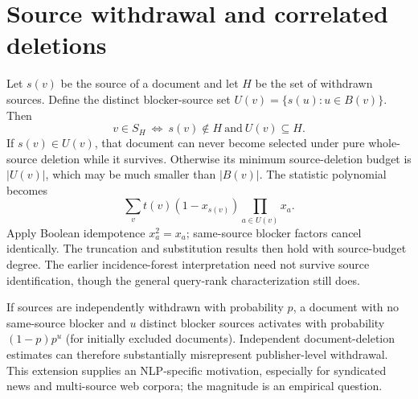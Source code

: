 \documentclass[11pt,a4paper]{article}
\theoremstyle{definition}\newtheorem{definition}[theorem]{Definition}
\begin{document}
\section{Source withdrawal and correlated deletions}\label{sec:sources}
Let $s(v)$ be the source of a document and let $H$ be the set of withdrawn sources. Define the distinct blocker-source set $U(v)=\{s(u):u\in B(v)\}$. Then
\begin{equation}
 v\in S_H\ \Longleftrightarrow\ s(v)\notin H\ \text{and}\ U(v)\subseteq H.
\end{equation}
If $s(v)\in U(v)$, that document can never become selected under pure whole-source deletion while it survives. Otherwise its minimum source-deletion budget is $|U(v)|$, which may be much smaller than $|B(v)|$. The statistic polynomial becomes
\[
 \sum_v t(v)(1-x_{s(v)})\prod_{a\in U(v)}x_a.
\]
Apply Boolean idempotence $x_a^2=x_a$; same-source blocker factors cancel identically. The truncation and substitution results then hold with source-budget degree. The earlier incidence-forest interpretation need not survive source identification, though the general query-rank characterization still does.

If sources are independently withdrawn with probability $p$, a document with no same-source blocker and $u$ distinct blocker sources activates with probability $(1-p)p^u$ (for initially excluded documents). Independent document-deletion estimates can therefore substantially misrepresent publisher-level withdrawal. This extension supplies an NLP-specific motivation, especially for syndicated news and multi-source web corpora; the magnitude is an empirical question.
\end{document}
